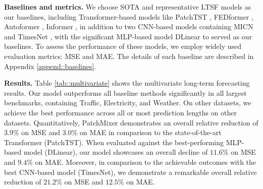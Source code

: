 \documentclass{article} \usepackage{iclr2024_conference,times}
\begin{document}
\textbf{Baselines and metrics.} We choose SOTA and representative LTSF models as our baselines, including Transformer-based models like PatchTST \citeyearpar{patchtst}, FEDformer \citeyearpar{fedformer}, Autoformer \citeyearpar{autoformer}, Informer \citeyearpar{informer}, in addition to two CNN-based models containing MICN \citeyearpar{micn} and TimesNet \citeyearpar{timesnet}, with the significant MLP-based model DLinear \citeyearpar{dlinear} to served as our baselines. To assess the performance of these models, we employ widely used evaluation metrics: MSE and MAE. The details of each baseline are described in Appendix \ref{append::baselines}.  



\textbf{Results.} Table \ref{tab::multivariate} shows the multivariate long-term forecasting results. Our model outperforms all baseline methods significantly in all largest benchmarks, containing Traffic, Electricity, and Weather. On other datasets, we achieve the best performance across all or most prediction lengths on other datasets. Quantitatively, PatchMixer demonstrates an overall relative reduction of $\mathbf{3.9\%}$ on MSE and $\mathbf{3.0\%}$ on MAE in comparison to the state-of-the-art Transformer (PatchTST). When evaluated against the best-performing MLP-based model (DLinear), our model showcases an overall decline of $\mathbf{11.6\%}$ on MSE and $\mathbf{9.4\%}$ on MAE. Moreover, in comparison to the achievable outcomes with the best CNN-based model (TimesNet), we demonstrate a remarkable overall relative reduction of $\mathbf{21.2\%}$ on MSE and $\mathbf{12.5\%}$ on MAE.
\end{document}
